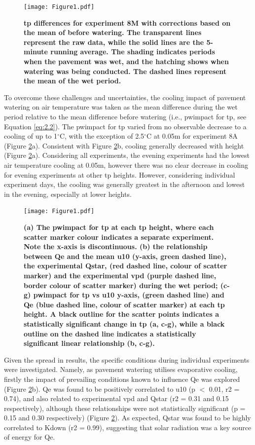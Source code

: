 \documentclass[final,3p,times,authoryear]{elsarticle}
\begin{document}
\begin{figure}
\centering
\texttt{[image: Figure1.pdf]}
\caption{\bf \gls{tp} differences for experiment 8M with corrections based on the mean of before watering. The transparent lines represent the raw data, while the solid lines are the 5-minute running average. The shading indicates periods when the pavement was wet, and the hatching shows when watering was being conducted. The dashed lines represent the mean of the wet period.}
 \label{fig:3.2}
\end{figure}

To overcome these challenges and uncertainties, the cooling impact of pavement watering on air temperature was taken as the mean difference during the wet period relative to the mean difference before watering (i.e., \gls{pwimpact} for \gls{tp}, see Equation \ref{eq:2.2}). The \gls{pwimpact} for \gls{tp} varied from no observable decrease to a cooling of up to 1$^{\circ}$C, with the exception of 2.5$^{\circ}$C at 0.05m for experiment 8A (Figure \ref{fig:3.3}a). Consistent with Figure \ref{fig:3.3}b, cooling generally decreased with height (Figure \ref{fig:3.3}a). Considering all experiments, the evening experiments had the lowest air temperature cooling at 0.05m, however there was no clear decrease in cooling for evening experiments at other \gls{tp} heights. However, considering individual experiment days, the cooling was generally greatest in the afternoon and lowest in the evening, especially at lower heights.

\begin{figure}
\texttt{[image: Figure1.pdf]}
\caption{\bf (a) The \gls{pwimpact} for \gls{tp} at each \gls{tp} height, where each scatter marker colour indicates a separate experiment. Note the x-axis is discontinuous. (b) the relationship between \gls{Qe} and the mean \gls{u10} (y-axis, green dashed line), the experimental \gls{Qstar}, (red dashed line, colour of scatter marker) and the experimental \gls{vpd} (purple dashed line, border colour of scatter marker) during the wet period; (c-g) \gls{pwimpact} for \gls{tp} vs \gls{u10} y-axis, (green dashed line) and \gls{Qe} (blue dashed line, colour of scatter marker) at each \gls{tp} height. A black outline for the scatter points indicates a statistically significant change in \gls{tp} (a, c-g), while a black outline on the dashed line indicates a statistically significant linear relationship (b, c-g).}
 \label{fig:3.3}
\end{figure}

Given the spread in results, the specific conditions during individual experiments were investigated. Namely, as pavement watering utilises evaporative cooling, firstly the impact of prevailing conditions known to influence \gls{Qe} was explored (Figure \ref{fig:3.3}b). \gls{Qe} was found to be positively correlated to \gls{u10} (\gls{p} $<$ 0.01, \gls{r2} = 0.74), and also related to experimental \gls{vpd} and \gls{Qstar} (\gls{r2} = 0.31 and 0.15 respectively), although these relationships were not statistically significant (\gls{p} = 0.15 and 0.30 respectively) (Figure \ref{fig:3.3}). As expected, \gls{Qstar} was found to be highly correlated to \gls{Kdown} (\gls{r2} = 0.99), suggesting that solar radiation was a key source of energy for \gls{Qe}.
\end{document}
